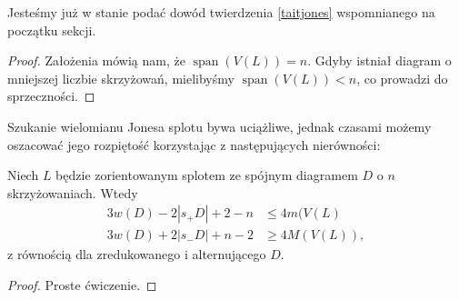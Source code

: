 Jesteśmy już w stanie podać dowód twierdzenia \ref{taitjones} wspomnianego na początku sekcji.

\begin{proof}
    Założenia mówią nam, że $\operatorname{span} (V(L)) = n$.
    Gdyby istniał diagram o mniejszej liczbie skrzyżowań,
    mielibyśmy $\operatorname{span} (V(L)) < n$, co prowadzi do sprzeczności.
\end{proof}

Szukanie wielomianu Jonesa splotu bywa uciążliwe, 
jednak czasami możemy oszacować jego rozpiętość korzystając z następujących nierówności:

\begin{corollary}
    Niech $L$ będzie zorientowanym splotem ze spójnym diagramem $D$ o $n$ skrzyżowaniach.
    Wtedy
    \begin{align*}
        3w(D)-2|s_+D|+2-n & \le 4 m(V(L) \\
        3w(D)+2|s_-D|+n-2 & \ge 4 M(V(L)),
    \end{align*}
    z równością dla zredukowanego i alternującego $D$.
\end{corollary}

\begin{proof}
    Proste ćwiczenie.
\end{proof}

